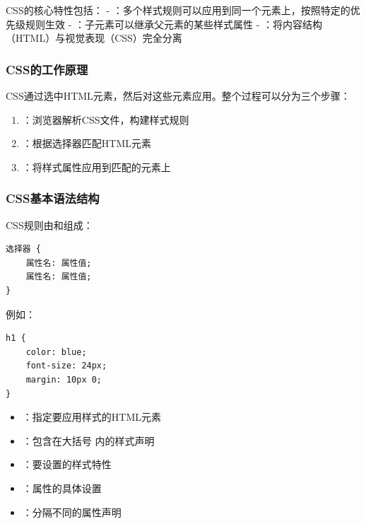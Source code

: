 CSS的核心特性包括： - ：多个样式规则可以应用到同一个元素上，按照特定的优先级规则生效 - ：子元素可以继承父元素的某些样式属性 - ：将内容结构（HTML）与视觉表现（CSS）完全分离

\hypertarget{cssux7684ux5de5ux4f5cux539fux7406}{%
\subsubsection{CSS的工作原理}\label{cssux7684ux5de5ux4f5cux539fux7406}}

CSS通过选中HTML元素，然后对这些元素应用。整个过程可以分为三个步骤：

\begin{enumerate}
\def\labelenumi{\arabic{enumi}.}
\tightlist
\item
  ：浏览器解析CSS文件，构建样式规则
\item
  ：根据选择器匹配HTML元素
\item
  ：将样式属性应用到匹配的元素上
\end{enumerate}

\hypertarget{cssux57faux672cux8bedux6cd5ux7ed3ux6784}{%
\subsubsection{CSS基本语法结构}\label{cssux57faux672cux8bedux6cd5ux7ed3ux6784}}

CSS规则由和组成：

\begin{lstlisting}[style=css]
选择器 {
    属性名: 属性值;
    属性名: 属性值;
}
\end{lstlisting}

例如：

\begin{lstlisting}[style=css]
h1 {
    color: blue;
    font-size: 24px;
    margin: 10px 0;
}
\end{lstlisting}


\begin{itemize}
\tightlist
\item
  ：指定要应用样式的HTML元素
\item
  ：包含在大括号 \code{{}} 内的样式声明
\item
  ：要设置的样式特性
\item
  ：属性的具体设置
\item
  ：分隔不同的属性声明
\end{itemize}

